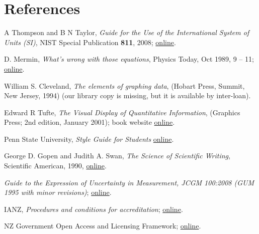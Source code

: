 \section{References}

\begingroup
\renewcommand{\section}[2]{}%

\begin{thebibliography}{9}
A Thompson and B N Taylor, \textit{Guide for the Use of the International System of Units (SI)}, NIST Special Publication \textbf{811}, 2008; \href{http://www.nist.gov/pml/pubs/sp811/index.cfm}{online}.

D. Mermin, \textit{What’s wrong with those equations}, Physics Today, Oct 1989, 9 – 11; \href{http://home.sandiego.edu/~severn/p480w/mathprose.pdf}{online}. 

William S. Cleveland, \textit{The elements of graphing data}, (Hobart Press, Summit, New Jersey, 1994) (our library copy is missing, but it is available by inter-loan).

Edward R Tufte, \textit{The Visual Display of Quantitative Information}, (Graphics Press; 2nd edition, January 2001); book website \href{http://www.edwardtufte.com/tufte/books_vdqi}{online}.

Penn State University, \textit{Style Guide for Students} \href{https://www.e-education.psu.edu/styleforstudents/}{online}.

George D. Gopen and Judith A. Swan, \textit{The Science of Scientific Writing}, Scientific American, 1990, \href{https://www.e-education.psu.edu/styleforstudents/c10_p6.html}{online}.

 \textit{Guide to the Expression of Uncertainty in Measurement, JCGM 100:2008 (GUM 1995 with minor revisions)}; \href{http://www.bipm.org/utils/common/documents/jcgm/JCGM_100_2008_E.pdf}{online}.

 IANZ, \textit{Procedures and conditions for accreditation}; \href{http://www.ianz.govt.nz/resources/documents-2/supplementary-criteria/}{online}.

 NZ Government Open Access and Licensing Framework; \href{https://www.ict.govt.nz/guidance-and-resources/open-government/new-zealand-government-open-access-and-licensing-nzgoal-framework}{online}.


\end{thebibliography}
